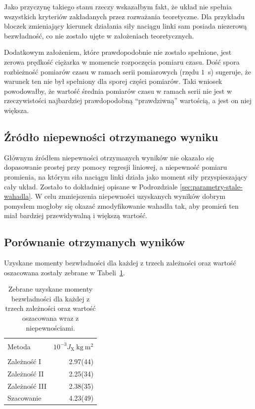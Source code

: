 \documentclass[twocolumn, a4paper, polish, 10pt]{article}
\newcommand{\JX}{\ensuremath{ J_{\mathrm{X}} }}
\begin{document}
Jako przyczynę takiego stanu rzeczy wskazałbym fakt, że układ nie spełnia wszystkich kryteriów zakładanych przez rozważania teoretyczne. Dla przykładu bloczek zmieniający kierunek działania siły naciągu linki sam posiada niezerową bezwładność, co nie zostało ujęte w założeniach teoretycznych.

Dodatkowym założeniem, które prawdopodobnie nie zostało spełnione, jest zerowa prędkość ciężarka w momencie rozpoczęcia pomiaru czasu. Dość spora rozbieżność pomiarów czasu w ramach serii pomiarowych (rzędu $1$~s) sugeruje, że warunek ten nie był spełniony dla sporej części pomiarów. Taki wniosek powodowałby, że wartość średnia pomiarów czasu w ramach serii nie jest w rzeczywistości najbardziej prawdopodobną \enquote{prawdziwną} wartością, a jest on niej większa.

\subsection{Źródło niepewności otrzymanego wyniku}
Głównym źródłem niepewności otrzymanych wyników nie okazało się dopasowanie prostej przy pomocy regresji liniowej, a niepewność pomiaru promienia, na którym siła naciągu linki działa jako moment siły przyspieszający cały układ. Zostało to dokładniej opisane w Podrozdziale \ref{sec:parametry-stale-wahadla}.
W celu zmniejszenia niepewności uzyskanych wyników dobrym pomysłem mogłoby się okazać zmodyfikowanie wahadła tak, aby promień ten miał bardziej przewidywalną i większą wartość.

\subsection{Porównanie otrzymanych wyników}
Uzyskane momenty bezwładności dla każdej z trzech zależności oraz wartość oszacowana zostały zebrane w Tabeli~\ref{tab:porownanie-wynikow}.
\begin{table}[ht]
\begin{center}
\renewcommand*{\tablename}{Tabela}
\caption{\small
Zebrane uzyskane momenty bezwładności dla każdej z trzech zależności oraz wartość oszacowana wraz z niepewnościami.
\vspace{0.15cm}
    \label{tab:porownanie-wynikow}}
    {\small
    \begin{tabular}{l r}
    \hline \vspace{-0.35cm} \\
      Metoda & $10^{-3} \JX~\mathrm{kg~m^2}$ \\
      \hline \vspace{-0.2cm} \\
      Zależność I & 2.97(44) \\
      Zależność II & 2.25(34) \\
      Zależność III & 2.38(35) \\
      Szacowanie & 4.23(49) \\
    \hline
    \end{tabular}}
    \end{center}
\end{table}
\end{document}
